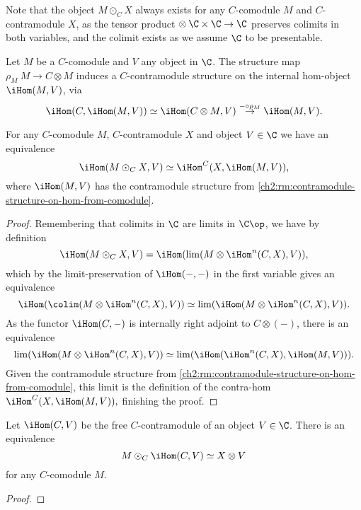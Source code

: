 \begin{remark}
    Note that the object $M\odot_C X$ always exists for any $C$-comodule $M$ and $C$-contramodule $X$, as the tensor product $\otimes \: \C\times \C\to \C$ preserves colimits in both variables, and the colimit exists as we assume $\C$ to be presentable.  
\end{remark}

\begin{remark}
    Let $M$ be a $C$-comodule and $V$ any object in $\C$. The structure map $\rho_M\: M\to C\otimes M$ induces a $C$-contramodule structure on the internal hom-object $\iHom(M, V)$, via 
    \[\iHom(C, \iHom(M, V))\simeq \iHom(C\otimes M, V)\overset{-\circ \rho_M}\to \iHom(M, V).\]
\end{remark}


\begin{proposition}
    For any $C$-comodule $M$, $C$-contramodule $X$ and object $V\in \C$ we have an equivalence
    \[\iHom(M\odot_C X, V)\simeq \iHom^C(X, \iHom(M, V)),\]
    where $\iHom(M, V)$ has the contramodule structure from \cref{ch2:rm:contramodule-structure-on-hom-from-comodule}. 
\end{proposition}
\begin{proof}
    Remembering that colimits in $\C$ are limits in $\C\op$, we have by definition 
    \[\iHom(M\odot_C X, V) = \iHom(\lim(M\otimes \iHom^n(C, X), V)),\]
    which by the limit-preservation of $\iHom(-,-)$ in the first variable gives an equivalence
    \[\iHom(\colim(M\otimes \iHom^n(C, X), V))\simeq \lim (\iHom(M\otimes \iHom^n(C, X), V)).\]
    As the functor $\iHom(C, -)$ is internally right adjoint to $C\otimes (-)$, there is an equivalence 
    \[\lim (\iHom(M\otimes \iHom^n(C, X), V)) \simeq \lim(\iHom(\iHom^n(C, X), \iHom(M, V))).\] 
    Given the contramodule structure from \cref{ch2:rm:contramodule-structure-on-hom-from-comodule}, this limit is the definition of the contra-hom $\iHom^C(X, \iHom(M, V)),$
    finishing the proof. 
\end{proof}


\begin{lemma}
    Let $\iHom(C, V)$ be the free $C$-contramodule of an object $V\in \C$. There is an equivalence 
    \[M\odot_C \iHom(C, V)\simeq X\otimes V\]
    for any $C$-comodule $M$. 
\end{lemma}
\begin{proof}
    
\end{proof}


